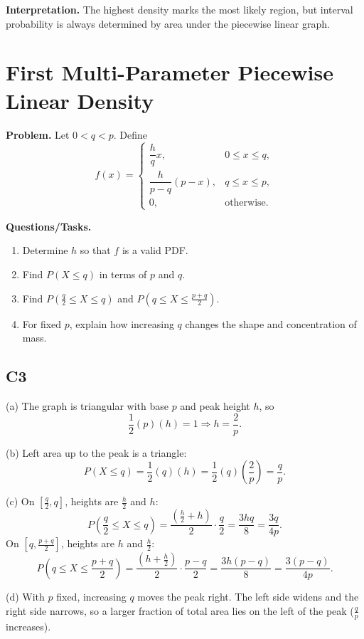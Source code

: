 \textbf{Interpretation.}
The highest density marks the most likely region, but interval probability is always determined by area under the piecewise linear graph.

\section{First Multi-Parameter Piecewise Linear Density}

\textbf{Problem.}
Let $0<q<p$. Define
\[
f(x)=\begin{cases}
\dfrac{h}{q}x, & 0\le x\le q,\\
\dfrac{h}{p-q}(p-x), & q\le x\le p,\\
0, & \text{otherwise.}
\end{cases}
\]

\textbf{Questions/Tasks.}
\begin{enumerate}[label=(\alph*)]
\item Determine $h$ so that $f$ is a valid PDF.
\item Find $P(X\le q)$ in terms of $p$ and $q$.
\item Find $P\!\left(\frac q2\le X\le q\right)$ and $P\!\left(q\le X\le\frac{p+q}{2}\right)$.
\item For fixed $p$, explain how increasing $q$ changes the shape and concentration of mass.
\end{enumerate}

\subsection*{C3}
(a) The graph is triangular with base $p$ and peak height $h$, so
\[
\frac12(p)(h)=1\Rightarrow h=\frac{2}{p}.
\]

(b) Left area up to the peak is a triangle:
\[
P(X\le q)=\frac12(q)(h)=\frac12(q)\left(\frac{2}{p}\right)=\frac{q}{p}.
\]

(c) On $\left[\frac q2,q\right]$, heights are $\frac h2$ and $h$:
\[
P\!\left(\frac q2\le X\le q\right)=\frac{\left(\frac h2+h\right)}{2}\cdot\frac q2=\frac{3hq}{8}=\frac{3q}{4p}.
\]
On $\left[q,\frac{p+q}{2}\right]$, heights are $h$ and $\frac h2$:
\[
P\!\left(q\le X\le\frac{p+q}{2}\right)=\frac{\left(h+\frac h2\right)}{2}\cdot\frac{p-q}{2}=\frac{3h(p-q)}{8}=\frac{3(p-q)}{4p}.
\]

(d) With $p$ fixed, increasing $q$ moves the peak right. The left side widens and the right side narrows, so a larger fraction of total area lies on the left of the peak ($\frac{q}{p}$ increases).

